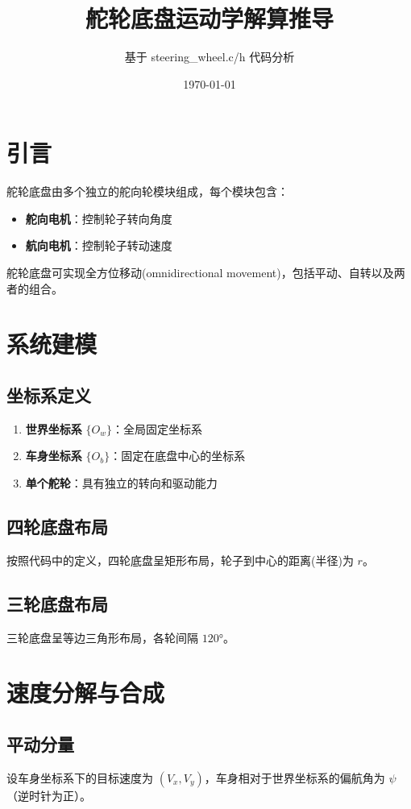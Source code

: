 \documentclass[12pt,a4paper]{article}
\title{\textbf{舵轮底盘运动学解算推导}}
\author{基于 steering_wheel.c/h 代码分析}
\date{\today}
\begin{document}
\maketitle

\section{引言}
舵轮底盘由多个独立的舵向轮模块组成，每个模块包含：
\begin{itemize}
    \item \textbf{舵向电机}：控制轮子转向角度
    \item \textbf{航向电机}：控制轮子转动速度
\end{itemize}

舵轮底盘可实现全方位移动(omnidirectional movement)，包括平动、自转以及两者的组合。

\section{系统建模}

\subsection{坐标系定义}

\begin{enumerate}
    \item \textbf{世界坐标系} $\{O_w\}$：全局固定坐标系
    \item \textbf{车身坐标系} $\{O_b\}$：固定在底盘中心的坐标系
    \item \textbf{单个舵轮}：具有独立的转向和驱动能力
\end{enumerate}

\subsection{四轮底盘布局}
按照代码中的定义，四轮底盘呈矩形布局，轮子到中心的距离(半径)为 $r$。

\subsection{三轮底盘布局}
三轮底盘呈等边三角形布局，各轮间隔 $120°$。

\section{速度分解与合成}

\subsection{平动分量}
设车身坐标系下的目标速度为 $(V_x, V_y)$，车身相对于世界坐标系的偏航角为 $\psi$（逆时针为正）。
\end{document}
